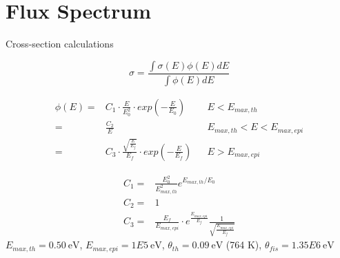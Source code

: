 \documentclass{beamer}
\begin{document}
\section{Flux Spectrum}

\begin{frame}{Cross-section calculations}

  \begin{equation*}
    \sigma=\frac{\int\sigma(E)\phi(E)dE}{\int\phi(E)dE}
  \end{equation*}

  \begin{align*}
    \phi(E) =& C_1\cdot \frac{E}{E_0^2} \cdot
    exp\left(-\frac{E}{E_0}\right) &&E<E_{max,th}\\
    =& \frac{C_2}{E}  &&E_{max,th}<E<E_{max,epi}\\
    =& C_3 \cdot \frac{\sqrt{\frac{E}{E_f}}}{E_f}
    \cdot exp\left(-\frac{E}{E_{f}}
    \right) &&E>E_{max,epi}
  \end{align*}


  {\tiny
    \setlength{\abovedisplayskip}{6pt}
    \setlength{\belowdisplayskip}{\abovedisplayskip}
    \setlength{\abovedisplayshortskip}{0pt}
    \setlength{\belowdisplayshortskip}{3pt}
    \begin{align*}
      C_1=&\frac{E_0^2}{E^2_{max,th}}e^{E_{max,th}/E_0}
      \\
      C_2=&1\\
      C_3=&\frac{E_f}{E_{max,epi}}
      \cdot
      e^{\frac{E_{max,epi}}{E_f}}\frac{1}
      {\sqrt{\frac{E_{max,epi}}{E_f}}}
    \end{align*}
    }%
  {\tiny
  $E_{max,th}=0.50\ \text{eV}$,
  $E_{max,epi}=1E5\ \text{eV}$,
  $\theta_{th}=0.09\ \text{eV}$ (764 K),
  $\theta_{fis}=1.35E6\ \text{eV}$}%
\end{frame}
\end{document}
